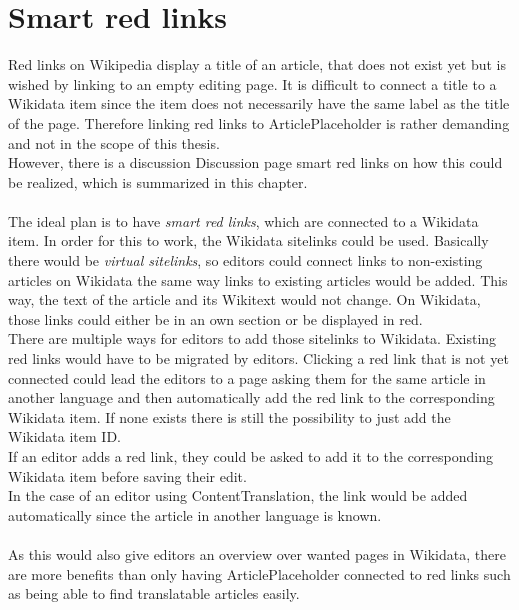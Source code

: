 \section{Smart red links}\label{sec:redLinks}
	Red links on Wikipedia display a title of an article, that does not exist yet but is wished by linking to an empty editing page. It is difficult to connect a title to a Wikidata item since the item does not necessarily have the same label as the title of the page. Therefore linking red links to ArticlePlaceholder is rather demanding and not in the scope of this thesis. \\
	However, there is a discussion Discussion page smart red links on how this could be realized, which is summarized in this chapter. \citep{wiki:22} \\
	\\
	The ideal plan is to have \textit{smart red links}, which are connected to a Wikidata item. In order for this to work, the Wikidata sitelinks could be used. Basically there would be \textit{virtual sitelinks}, so editors could connect links to non-existing articles on Wikidata the same way links to existing articles would be added. This way, the text of the article and its Wikitext would not change. On Wikidata, those links could either be in an own section or be displayed in red. \\
	There are multiple ways for editors to add those sitelinks to Wikidata. Existing red links would have to be migrated by editors. Clicking a red link that is not yet connected could lead the editors to a page asking them for the same article in another language and then automatically add the red link to the corresponding Wikidata item. If none exists there is still the possibility to just add the Wikidata item ID. \\
	If an editor adds a red link, they could be asked to add it to the corresponding Wikidata item before saving their edit. \\
	In the case of an editor using ContentTranslation, the link would be added automatically since the article in another language is known. \\
	\\
	As this would also give editors an overview over wanted pages in Wikidata, there are more benefits than only having ArticlePlaceholder connected to red links such as being able to find translatable articles easily.